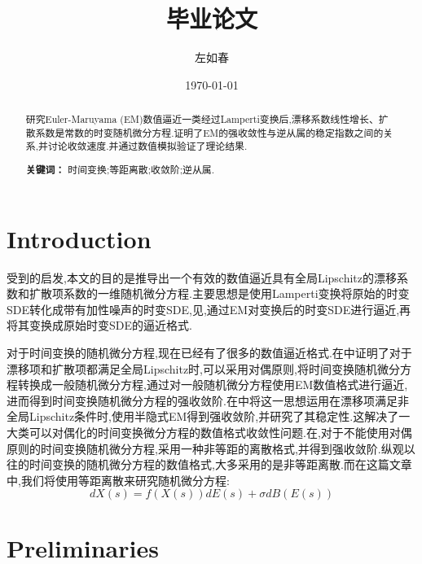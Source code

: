\documentclass[12pt,final]{article}
\title{毕业论文}
\author{左如春}
\date{\today}
\numberwithin{equation}{section}
\numberwithin{figure}{section}
\numberwithin{table}{section}
\theoremstyle{plain}
\theoremstyle{definition}
\theoremstyle{remark}
\begin{document}
	
	\maketitle
	
	\begin{abstract}
		研究Euler-Maruyama (EM)数值逼近一类经过Lamperti变换后,漂移系数线性增长、扩散系数是常数的时变随机微分方程.证明了EM的强收敛性与逆从属的稳定指数之间的关系,并讨论收敛速度.并通过数值模拟验证了理论结果.
		
		\medskip
		\noindent\textbf{关键词：} 时间变换;等距离散;收敛阶;逆从属.
	\end{abstract}
	
	
	
	
	
	\section{Introduction}
	
	受到\cite{Alfonsi2013602}的启发,本文的目的是推导出一个有效的数值逼近具有全局Lipschitz的漂移系数和扩散项系数的一维随机微分方程.主要思想是使用Lamperti变换将原始的时变SDE转化成带有加性噪声的时变SDE,见\cite{iacus2008simulation},通过EM对变换后的时变SDE进行逼近,再将其变换成原始时变SDE的逼近格式.
	
	对于时间变换的随机微分方程,现在已经有了很多的数值逼近格式.在\cite{jum2014strong}中证明了对于漂移项和扩散项都满足全局Lipschitz时,可以采用对偶原则,将时间变换随机微分方程转换成一般随机微分方程,通过对一般随机微分方程使用EM数值格式进行逼近,进而得到时间变换随机微分方程的强收敛阶.在\cite{deng2020semi}中将这一思想运用在漂移项满足非全局Lipschitz条件时,使用半隐式EM得到强收敛阶,并研究了其稳定性.这解决了一大类可以对偶化的时间变换微分方程的数值格式收敛性问题.在\cite{jin2019strong},对于不能使用对偶原则的时间变换随机微分方程,采用一种非等距的离散格式,并得到强收敛阶.纵观以往的时间变换的随机微分方程的数值格式,大多采用的是非等距离散.而在这篇文章中,我们将使用等距离散来研究随机微分方程:
	\begin{equation}\label{basic SDE}
		dX(s)=f(X(s))dE(s)+\sigma dB(E(s))
	\end{equation}
	
	\section{Preliminaries}
	
\end{document}
